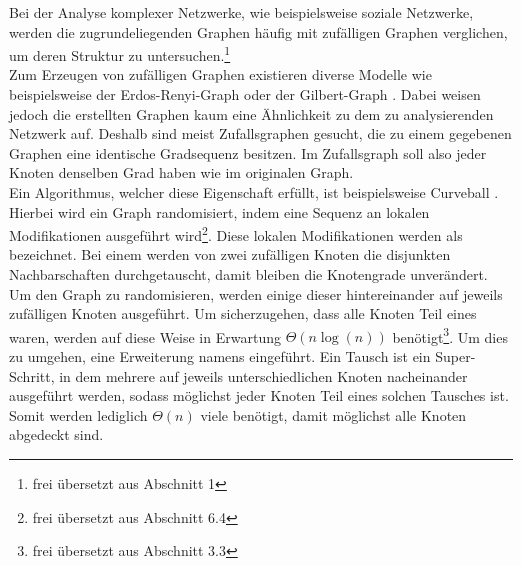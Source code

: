 \glqq Bei der Analyse komplexer Netzwerke, wie beispielsweise soziale Netzwerke, 
werden die zugrundeliegenden Graphen häufig mit zufälligen Graphen verglichen, 
um deren Struktur zu untersuchen.\grqq\footnote{frei übersetzt aus \cite{DBLP:conf/esa/CarstensH0PTW18} Abschnitt 1}
\\

Zum Erzeugen von zufälligen Graphen existieren diverse Modelle wie beispielsweise der Erdos-Renyi-Graph \cite{erdos}
oder der Gilbert-Graph \cite{gilbert}.
Dabei weisen jedoch die erstellten Graphen kaum eine Ähnlichkeit zu dem zu analysierenden Netzwerk auf.
Deshalb sind meist Zufallsgraphen gesucht, die zu einem gegebenen Graphen eine identische Gradsequenz
besitzen. Im Zufallsgraph soll also jeder Knoten denselben Grad haben wie im originalen Graph.
\\

Ein Algorithmus, welcher diese Eigenschaft erfüllt, ist beispielsweise Curveball \cite{curveball}.
Hierbei wird ein Graph \glqq randomisiert, indem eine Sequenz an lokalen Modifikationen ausgeführt wird\grqq\footnote{\label{ftn:survey}frei übersetzt aus \cite{penschuck2020recent} Abschnitt 6.4}.
Diese lokalen Modifikationen werden als \ct{} bezeichnet. Bei einem \ct{} werden von zwei zufälligen 
Knoten die disjunkten Nachbarschaften durchgetauscht, damit bleiben die Knotengrade unverändert.
Um den Graph zu randomisieren, werden einige dieser  hintereinander auf jeweils zufälligen Knoten ausgeführt.
Um sicherzugehen, dass alle Knoten Teil eines  waren, werden auf diese Weise
\glqq in Erwartung $\Theta(n\log(n))$   benötigt\grqq \footnote{frei übersetzt aus \cite{DBLP:conf/esa/CarstensH0PTW18} Abschnitt 3.3}.
Um dies zu umgehen,  eine Erweiterung namens \gc{} \cite{DBLP:conf/esa/CarstensH0PTW18} eingeführt. 
Ein \gc{} Tausch ist ein \glqq Super-Schritt\grqq {}, in dem mehrere  auf jeweils
unterschiedlichen Knoten nacheinander ausgeführt werden, sodass möglichst jeder Knoten Teil eines solchen Tausches ist. 
Somit werden lediglich $\Theta(n)$ viele  benötigt, %
damit möglichst alle Knoten abgedeckt sind.
\\

